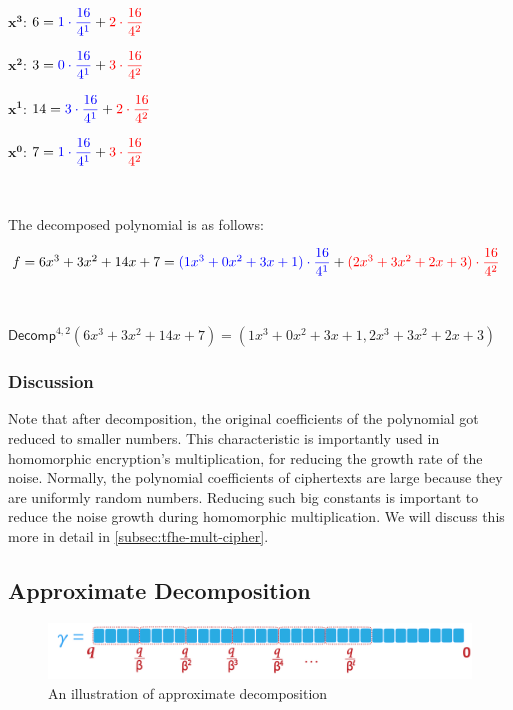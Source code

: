 $\bm{x^3}$: $6 = \color{blue}{1 \cdot \dfrac{16}{4^1}} \color{black}+ \color{red}{2 \cdot \dfrac{16}{4^2}}$

$\bm{x^2}$: $3 = \color{blue}{0 \cdot \dfrac{16}{4^1}} \color{black}+ \color{red}{3 \cdot \dfrac{16}{4^2}}$

$\bm{x^1}$: $14 = \color{blue}{3 \cdot \dfrac{16}{4^1}} \color{black}+ \color{red}{2 \cdot \dfrac{16}{4^2}}$

$\bm{x^0}$: $7 = \color{blue}{1 \cdot \dfrac{16}{4^1}} \color{black}+ \color{red}{3 \cdot \dfrac{16}{4^2}}$

$ $

The decomposed polynomial is as follows:

$f = 6x^3 + 3x^2 + 14x + 7 = \color{blue}{(1x^3 + 0x^2 + 3x + 1) \cdot \dfrac{16}{4^1}} \color{black}+ \color{red}{(2x^3 + 3x^2 + 2x + 3) \cdot \dfrac{16}{4^2}} \color{black}$

$ $

$\textsf{Decomp}^{4, 2}(6x^3 + 3x^2 + 14x + 7) = (1x^3 + 0x^2 + 3x + 1, 2x^3 + 3x^2 + 2x + 3)$

\subsubsection{Discussion}

Note that after decomposition, the original coefficients of the polynomial got reduced to smaller numbers. This characteristic is importantly used in homomorphic encryption's multiplication, for reducing the growth rate of the noise. Normally, the polynomial coefficients of ciphertexts are large because they are uniformly random numbers. Reducing such big constants is important to reduce the noise growth during homomorphic multiplication. We will discuss this more in detail in \autoref{subsec:tfhe-mult-cipher}.


\subsection{Approximate Decomposition}
\label{subsec:approx-decomp}

\begin{figure}[h!]
    \centering
  \includegraphics[width=0.7\linewidth]{figures/decomp3.pdf}
  \caption{An illustration of approximate decomposition}
  \label{fig:decomp3}
\end{figure}

